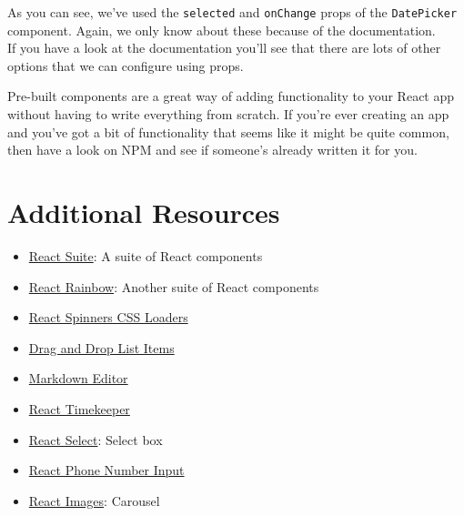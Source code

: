
As you can see, we've used the \texttt{selected} and \texttt{onChange} props of the \texttt{DatePicker} component. Again, we only know about these because of the documentation.
\\

If you have a look at the documentation you'll see that there are lots of other options that we can configure using props.

\hr

Pre-built components are a great way of adding functionality to your React app without having to write everything from scratch. If you're ever creating an app and you've got a bit of functionality that seems like it might be quite common, then have a look on NPM and see if someone's already written it for you.



\section{Additional Resources}

\begin{itemize}[leftmargin=*]
    \item \href{https://rsuitejs.com/en/}{React Suite}: A suite of React components
    \item \href{https://react-rainbow.web.app}{React Rainbow}: Another suite of React components
    \item \href{https://github.com/JoshK2/react-spinners-css}{React Spinners CSS Loaders}
    \item \href{https://github.com/atlassian/react-beautiful-dnd}{Drag and Drop List Items}
    \item \href{https://github.com/uiwjs/react-md-editor}{Markdown Editor}
    \item \href{https://catc.github.io/react-timekeeper/}{React Timekeeper}
    \item \href{https://react-select.com/home}{React Select}: Select box
    \item \href{https://github.com/catamphetamine/react-phone-number-input}{React Phone Number Input}
    \item \href{https://github.com/jossmac/react-images}{React Images}: Carousel
\end{itemize}
